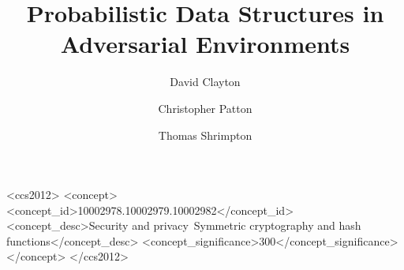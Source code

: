 \documentclass[sigconf]{acmart}
\begin{document}
\fancyhead{}

\title{Probabilistic Data Structures in Adversarial Environments}


\author{David Clayton}

\author{Christopher Patton}

\author{Thomas Shrimpton}

%
\renewcommand{\shortauthors}{Trovato and Tobin, et al.}

%
\begin{abstract}

\end{abstract}

%
%
\begin{CCSXML}
<ccs2012>
<concept>
<concept_id>10002978.10002979.10002982</concept_id>
<concept_desc>Security and privacy~Symmetric cryptography and hash functions</concept_desc>
<concept_significance>300</concept_significance>
</concept>
</ccs2012>
\end{CCSXML}


%
\end{document}
